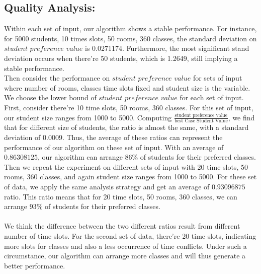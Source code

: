 \documentclass[11pt, oneside]{article}   	%
\begin{document}
\subsection{Quality Analysis:}
Within each set of input, our algorithm shows a stable performance. For instance, for 5000 students, 10 times slots, 50 rooms, 360 classes, the standard deviation on $student$  $preference$  $value$ is 0.0271174. Furthermore, the most significant stand deviation occurs when there're 50 students, which is 1.2649, still implying a stable performance. 
\\Then consider the performance on $student$ $preference$ $value$ for sets of input where number of rooms, classes time slots fixed and student size is the variable. We choose the lower bound of $student$ $preference$ $value$ for each set of input. First, consider there're 10 time slots, 50 rooms, 360 classes. For this set of input, our student size ranges from 1000 to 5000. Computing $\frac{\text{student preference value}}{\text{best Case Student Value}}$, we find that for different size of students, the ratio is almost the same, with a standard deviation of 0.0009. Thus, the average of these ratios can represent the performance of our algorithm on these set of input. With an average of $0.86308125$, our algorithm can arrange $86\%$ of students for their preferred classes. Then we repeat the experiment on different sets of input with 20 time slots, 50 rooms, 360 classes, and again student size ranges from 1000 to 5000. For these set of data, we apply the same analysis strategy and get an average of $0.93096875$ ratio. This ratio means that for 20 time slots, 50 rooms, 360 classes, we can arrange $93\%$ of students for their preferred classes.\\
\\We think the difference between the two different ratios result from different number of time slots. For the second set of data, there're 20 time slots, indicating more slots for classes and also a less occurrence of time conflicts. Under such a circumstance, our algorithm can arrange more classes and will thus generate a better performance.
\end{document}
